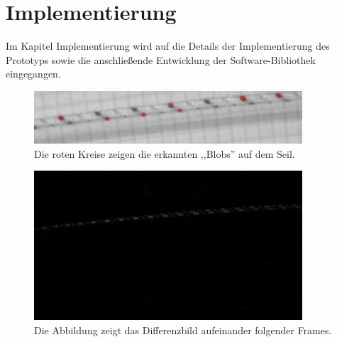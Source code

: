 \documentclass[10pt,a4paper]{scrarticle}
\begin{document}
\section{Implementierung}
Im Kapitel Implementierung wird auf die Details der Implementierung des Prototyps sowie die anschließende Entwicklung der Software-Bibliothek eingegangen. 
\begin{figure}
  \includegraphics[width=10cm]{Abbildungen/blob_detection.png}
  \centering
  \caption{Die roten Kreise zeigen die erkannten ,,Blobs'' auf dem Seil.}
  \label{fig:blobImg}
\end{figure}
\begin{figure}
  \includegraphics[width=10cm]{Abbildungen/diff_img_cropped.png}
  \centering
  \caption{Die Abbildung zeigt das Differenzbild aufeinander folgender Frames.}
  \label{fig:diffImg}
\end{figure}
\end{document}
